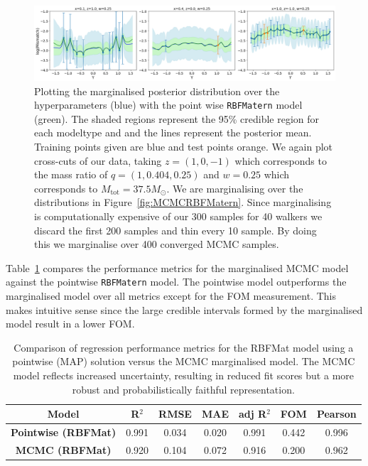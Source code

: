 \documentclass{ucdgradtaughtthesis}
\begin{document}
\begin{figure}[H]
    \centering
    \includegraphics[width=1\textwidth]{LatexPlots/final_gps_plots/MCMCpointwisecomparison_all.png}
    \caption[Comparing the pointwise  model with an alternative marginalised over its hyper-parmeters.]{Plotting the marginalised posterior distribution over the hyperparameters (blue) with the point wise \texttt{RBFMatern} model (green). The shaded regions represent the 95\% credible region
    for each modeltype and and the lines represent the posterior mean. Training points given are blue and test points orange. We again plot cross-cuts of our data, taking \(z = (1,0,-1)\) which corresponds to the mass ratio of \(q = (1,0.404,0.25)\) and \(w = 0.25\) which corresponds to \(M_{\text{tot}} = 37.5M_\odot\). We are marginalising over the distributions in Figure~\ref{fig:MCMCRBFMatern}. 
    Since marginalising is computationally expensive of our 300 samples for 40 walkers we discard the first 200 samples and thin every 10 sample. By doing this we marginalise over 400 converged MCMC samples.}
    \label{fig:MCMCvsmarginalised}
\end{figure}
%
Table~\ref{tab:pointwise_vs_mcmc} compares the performance metrics for the marginalised MCMC model against the pointwise \texttt{RBFMatern} model.
The pointwise model outperforms the marginalised model over all metrics except for the FOM measurement. This makes intuitive sense since the large credible intervals
formed by the marginalised model result in a lower FOM. 
% 
\begin{table}[H]
    \centering
    \small
    \renewcommand{\arraystretch}{1.3}
    \begin{tabular}{|c|c|c|c|c|c|c|}
    \hline
    \textbf{Model} & \textbf{R$^2$} & \textbf{RMSE} & \textbf{MAE} & \textbf{adj R$^2$} & \textbf{FOM} & \textbf{Pearson} \\
    \hline
    \textbf{Pointwise (RBFMat)} & 0.991 & 0.034 & 0.020 & 0.991 & 0.442 & 0.996 \\
    \textbf{MCMC (RBFMat)}      & 0.920 & 0.104 & 0.072 & 0.916 & 0.200 & 0.962 \\
    \hline
    \end{tabular}
    \caption[Comparing metrics between the pointwise \texttt{RBFMatern} model and its equivalent model marginalised over the hyperparameters.]{Comparison of regression performance metrics for the RBFMat model using a pointwise (MAP) solution versus the MCMC marginalised model. The MCMC model reflects increased uncertainty, resulting in reduced fit scores but a more robust and probabilistically faithful representation.}
    \label{tab:pointwise_vs_mcmc}
\end{table}
%
\end{document}
